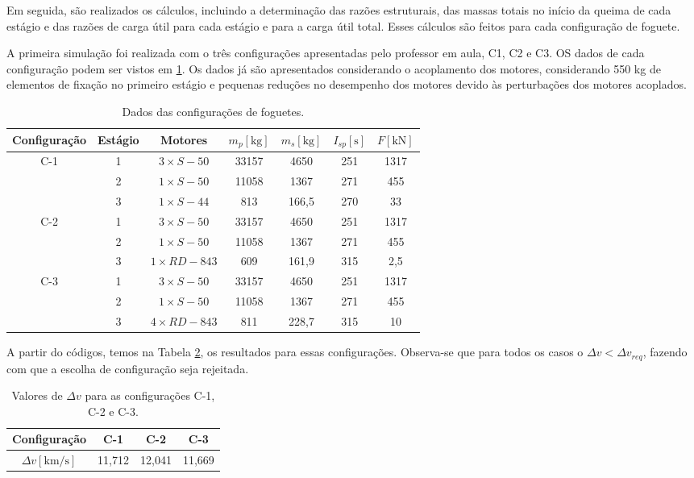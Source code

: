 Em seguida, são realizados os cálculos, incluindo a determinação das razões estruturais, das massas totais no início da queima de cada estágio e das razões de carga útil para cada estágio e para a carga útil total. Esses cálculos são feitos para cada configuração de foguete.

A primeira simulação foi realizada com o três configurações apresentadas pelo professor em aula, C1, C2 e C3. OS dados de cada configuração podem ser vistos em \ref{tab:primeira}. Os dados já são apresentados considerando o acoplamento dos motores, considerando 550 kg de elementos de fixação no primeiro estágio e pequenas reduções no desempenho dos motores devido
às perturbações dos motores acoplados.

\begin{table}[H]
\centering
\caption{Dados das configurações de foguetes.}
\label{tab:primeira}
\begin{tabular}{ccccccc}
\toprule
Configuração & Estágio & Motores & $m_{p}[\mathrm{kg}]$ & $m_{s}[\mathrm{kg}]$ & $I_{s p}[\mathrm{s}]$ & $F[\mathrm{kN}]$ \\
\midrule
C-1 & 1 & $3 \times S-50$ & 33157 & 4650 & 251 & 1317 \\
 & 2 & $1 \times S-50$ & 11058 & 1367 & 271 & 455 \\
 & 3 & $1 \times S-44$ & 813 & 166,5 & 270 & 33 \\
\midrule
C-2 & 1 & $3 \times S-50$ & 33157 & 4650 & 251 & 1317 \\
 & 2 & $1 \times S-50$ & 11058 & 1367 & 271 & 455 \\
 & 3 & $1 \times R D-843$ & 609 & 161,9 & 315 & 2,5 \\
\midrule
C-3 & 1 & $3 \times S-50$ & 33157 & 4650 & 251 & 1317 \\
 & 2 & $1 \times S-50$ & 11058 & 1367 & 271 & 455 \\
 & 3 & $4 \times R D-843$ & 811 & 228,7 & 315 & 10 \\
\bottomrule
\end{tabular}

\end{table}

A partir do códigos, temos na Tabela \ref{tab:primeirosdados}, os resultados para essas configurações. Observa-se que para todos os casos o $\Delta v < \Delta v_{req}$, fazendo com que a escolha de configuração seja rejeitada.

\begin{table}[H]
\centering
\caption{Valores de $\Delta v$ para as configurações C-1, C-2 e C-3.}
\label{tab:primeirosdados}
\begin{tabular}{cccc}
\toprule
Configuração & C-1 & C-2 & C-3 \\
\midrule
$\Delta v[\mathrm{km} / \mathrm{s}]$ & 11,712 & 12,041 & 11,669 \\
\bottomrule
\end{tabular}

\end{table}

